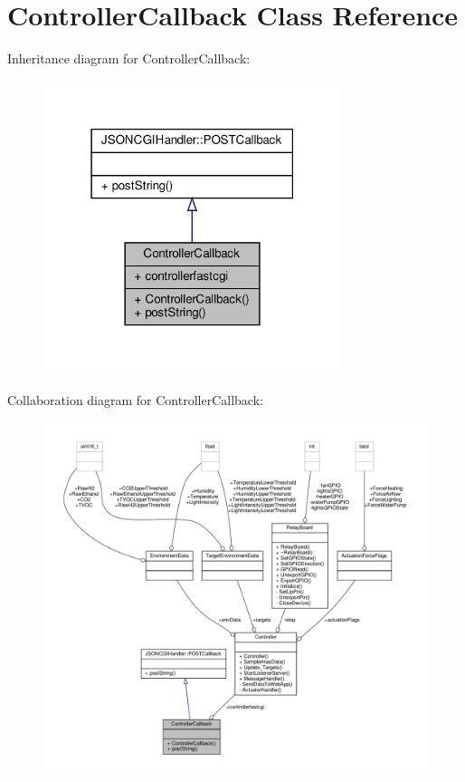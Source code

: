\hypertarget{classControllerCallback}{}\section{Controller\+Callback Class Reference}
\label{classControllerCallback}


Inheritance diagram for Controller\+Callback\+:\nopagebreak
\begin{figure}[H]
\begin{center}
\leavevmode
\includegraphics[width=247pt]{classControllerCallback__inherit__graph}
\end{center}
\end{figure}


Collaboration diagram for Controller\+Callback\+:\nopagebreak
\begin{figure}[H]
\begin{center}
\leavevmode
\includegraphics[width=350pt]{classControllerCallback__coll__graph}
\end{center}
\end{figure}
